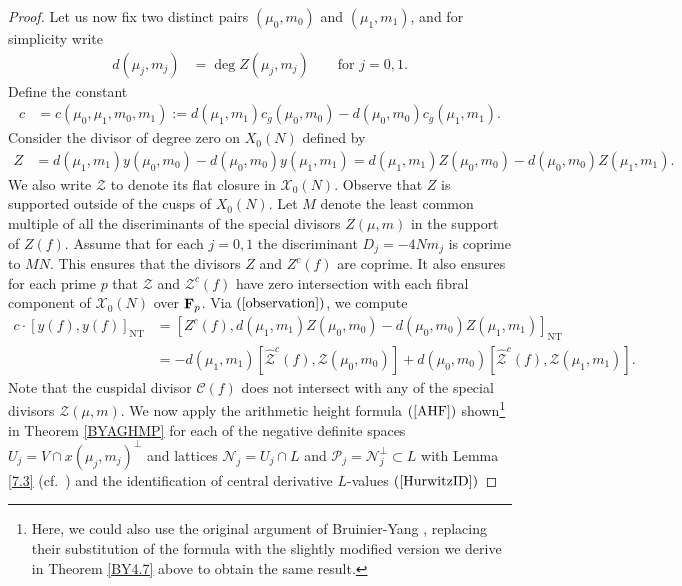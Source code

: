 \documentclass{amsart}
\theoremstyle{definition}
\theoremstyle{definition}
\theoremstyle{definition}
\begin{document}
\begin{proof}
Let us now fix two distinct pairs $(\mu_0, m_0)$ and $(\mu_1, m_1)$, and for simplicity write
\begin{align*} d(\mu_j, m_j) &= \deg Z(\mu_j, m_j) \quad \quad \text{for $j=0,1$}. \end{align*}
Define the constant  
\begin{align*} c &= c(\mu_0, \mu_1, m_0, m_1) := d(\mu_1, m_1) c_g(\mu_0, m_0) - d(\mu_0, m_0) c_g(\mu_1, m_1). \end{align*}
Consider the divisor of degree zero on $X_0(N)$ defined by 
\begin{align*} Z &= d(\mu_1, m_1) y(\mu_0, m_0) - d(\mu_0, m_0) y(\mu_1, m_1) 
= d(\mu_1, m_1) Z(\mu_0, m_0) - d(\mu_0, m_0) Z( \mu_1, m_1). \end{align*}
We also write $\mathcal{Z}$ to denote its flat closure in $\mathcal{X}_0(N)$. Observe that $Z$ is supported outside of the cusps of $X_0(N)$. 
Let $M$ denote the least common multiple of all the discriminants of the special divisors $Z(\mu, m)$ in the support of $Z(f)$.
Assume that for each $j=0, 1$ the discriminant $D_j = -4N m_j$ is coprime to $MN$. This ensures that the divisors $Z$ and $Z^c(f)$ are coprime. 
It also ensures for each prime $p$ that $\mathcal{Z}$ and $\mathcal{Z}^c(f)$ have zero intersection with each fibral component of 
$\mathcal{X}_0(N)$ over ${\bf{F}}_p$. Via $(\ref{observation})$, we compute 
\begin{align*} c \cdot \left[ y(f), y(f) \right]_{\operatorname{NT}} 
&= \left[ Z^c(f), d(\mu_1, m_1) Z(\mu_0, m_0) - d(\mu_0, m_0) Z(\mu_1, m_1) \right]_{\operatorname{NT}} \\
&= - d (\mu_1, m_1) \left[ \widehat{\mathcal{Z}}^c(f), \mathcal{Z}(\mu_0, m_0) \right] 
+ d(\mu_0, m_0) \left[ \widehat{\mathcal{Z}}^c(f), \mathcal{Z}( \mu_1, m_1) \right].\end{align*}
Note that the cuspidal divisor $\mathcal{C}(f)$ does not intersect with any of the special divisors $\mathcal{Z}(\mu, m)$. 
We now apply the arithmetic height formula $(\ref{AHF})$ shown\footnote{Here, we could also use the original 
argument of Bruinier-Yang \cite[Theorem 7.7]{BY}, replacing their substitution of the formula \cite[Theorem 4.7]{BY}
with the slightly modified version we derive in Theorem \ref{BY4.7} above to obtain the same result.} in Theorem \ref{BYAGHMP}
for each of the negative definite spaces $U_j = V \cap x(\mu_j, m_j)^{\perp}$ and lattices 
$\mathcal{N}_j = U_j \cap L$ and $\mathcal{P}_j = \mathcal{N}_j^{\perp} \subset L$
with Lemma \ref{7.3} (cf.~\cite[Lemma 7.3]{BY}) and the identification of central derivative $L$-values $(\ref{HurwitzID})$ 

\end{proof}
\end{document}
